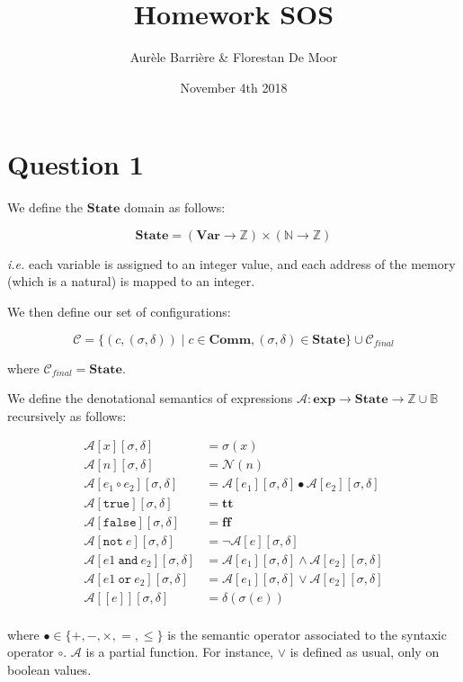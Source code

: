 \documentclass{article}
\title{Homework SOS}
\author{Aur\`ele Barri\`ere \& Florestan De Moor}
\date{November 4th 2018}
\newcommand{\var}{\mathbf{Var}}
\newcommand{\state}{\mathbf{State}}
\newcommand{\comm}{\mathbf{Comm}}
\newcommand{\A}{\mathcal{A}}
\newcommand{\C}{\mathcal{C}}
\newcommand{\Aa}[2]{\mathcal{A}\left[#1\right]\left[#2\right]}
\newcommand{\N}{\mathcal{N}}
\newcommand{\true}{\mathbf{tt}}
\newcommand{\false}{\mathbf{ff}}
\newcommand{\expr}{\mathbf{exp}}
\newcommand{\ie}{\emph{i.e.}}
\begin{document}
\maketitle

\section*{Question 1}


We define the $\state{}$ domain as follows:

\[
\state{} = \left(\var{}  \longrightarrow \mathbb{Z} \right) \times \left( \mathbb{N} \longrightarrow \mathbb{Z} \right)
\]

\ie{} each variable is assigned to an integer value, and each address of the memory (which is a natural) is mapped to an integer.

We then define our set of configurations:

\[
\C = \lbrace \left( c, (\sigma, \delta) \right) \mid c \in \comm{}, (\sigma, \delta) \in \state{} \rbrace \cup \C_{final}
\]

where $\C_{final} = \state{}$.

We define the denotational semantics of expressions $\A{}: \expr{} \longrightarrow \state{} \longrightarrow \mathbb{Z} \cup \mathbb{B}$ recursively as follows:

\begin{align*}
	\Aa{x}{\sigma, \delta} &= \sigma(x) \\
	\Aa{n}{\sigma, \delta} &= \N(n) \\
	\Aa{e_1 \circ e_2}{\sigma, \delta} &= \Aa{e_1}{\sigma, \delta} \bullet \Aa{e_2}{\sigma, \delta} \\
	\Aa{\texttt{true}}{\sigma, \delta} &= \true{} \\
	\Aa{\texttt{false}}{\sigma, \delta} &= \false{} \\
	\Aa{\texttt{not}~e}{\sigma, \delta} &= \neg \Aa{e}{\sigma, \delta} \\
	\Aa{e1~\texttt{and}~e_2}{\sigma, \delta} &= \Aa{e_1}{\sigma, \delta} \wedge \Aa{e_2}{\sigma, \delta} \\
	\Aa{e1~\texttt{or}~e_2}{\sigma, \delta} &= \Aa{e_1}{\sigma, \delta} \vee \Aa{e_2}{\sigma, \delta} \\
	\Aa{[e]}{\sigma, \delta} &= \delta(\sigma(e)) \\
\end{align*}

where $\bullet \in \lbrace +, -, \times, =, \leq \rbrace$ is the semantic operator associated to the syntaxic operator $\circ$. $\A{}$ is a partial function. For instance, $\vee$ is defined as usual, only on boolean values.
\end{document}
